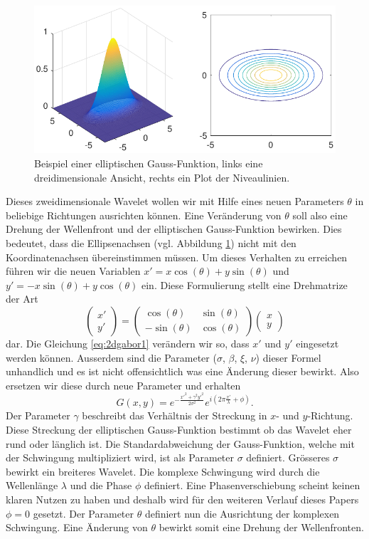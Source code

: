 \begin{figure}
	\centering
	\includegraphics[width=0.7\linewidth]{./papers/visuell/images/2d_gauss.pdf}
	\caption{Beispiel einer elliptischen Gauss-Funktion, links eine dreidimensionale Ansicht, rechts ein Plot der Niveaulinien.}
	\label{fig:2d_gauss}
\end{figure}

Dieses zweidimensionale Wavelet wollen wir mit Hilfe eines neuen Parameters $\theta$ in beliebige Richtungen ausrichten können.
Eine Veränderung von $\theta$ soll also eine Drehung der Wellenfront und der elliptischen Gauss-Funktion bewirken.
Dies bedeutet, dass die Ellipsenachsen (vgl. Abbildung \ref{fig:2d_gauss}) nicht mit den Koordinatenachsen übereinstimmen müssen. 
Um dieses Verhalten zu erreichen führen wir die neuen Variablen $x'=x\cos(\theta)+y\sin(\theta)$ und $y'=-x\sin(\theta)+y\cos(\theta)$ ein.
Diese Formulierung stellt eine Drehmatrize der Art
\begin{equation}
\begin{pmatrix}
x' \\
y'
\end{pmatrix}
=
\begin{pmatrix}
\cos(\theta) & \sin(\theta) \\
-\sin(\theta) & \cos(\theta)
\end{pmatrix}
\begin{pmatrix}
x \\
y
\end{pmatrix}
\end{equation}
dar.
Die Gleichung \ref{eq:2dgabor1} verändern wir so, dass $x'$ und $y'$ eingesetzt werden können.
Ausserdem sind die Parameter ($\sigma$, $\beta$, $\xi$, $\nu$) dieser Formel unhandlich und es ist nicht offensichtlich was eine Änderung dieser bewirkt.
Also ersetzen wir diese durch neue Parameter und erhalten 
\begin{equation}
G(x,y)=e^{-\frac{x'^{2}+\gamma^{2}y'^{2}}{2\sigma^{2}}}
e^{i(2\pi\frac{x'}{\lambda} + \phi)}.
\end{equation} 
Der Parameter $\gamma$ beschreibt das Verhältnis der Streckung in $x$- und $y$-Richtung.
Diese Streckung der elliptischen Gauss-Funktion bestimmt ob das Wavelet eher rund oder länglich ist.
Die Standardabweichung der Gauss-Funktion, welche mit der Schwingung multipliziert wird, ist als Parameter $\sigma$ definiert.
Grösseres $\sigma$ bewirkt ein breiteres Wavelet.
Die komplexe Schwingung wird durch die Wellenlänge $\lambda$ und die Phase $\phi$ definiert.
Eine Phasenverschiebung scheint keinen klaren Nutzen zu haben und deshalb  wird für den weiteren Verlauf dieses Papers $\phi=0$ gesetzt.
Der Parameter $\theta$ definiert nun die Ausrichtung der komplexen Schwingung.
Eine Änderung von $\theta$  bewirkt somit eine Drehung der Wellenfronten.

